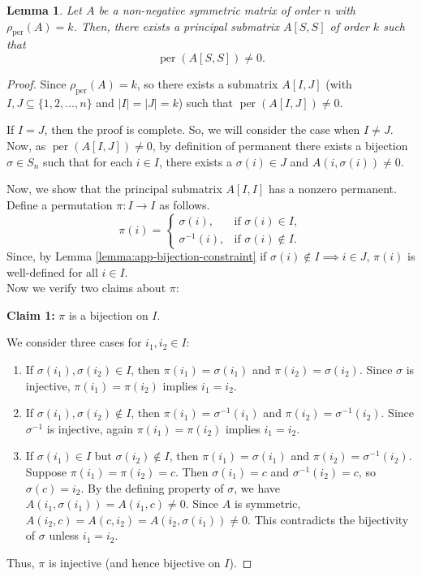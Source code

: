 \documentclass[10pt,a4paper]{amsart}
\newtheorem{lemma}{Lemma}
\DeclareMathOperator{\per}{per}
\begin{document}
\begin{lemma}\label{lemma:app-principal-existence}
Let \( A \) be a non-negative symmetric matrix of order \( n \) with \( \rho_{\per}(A) = k \). Then, there exists a principal submatrix \( A[S, S] \) of order \( k \) such that
\[
\per(A[S, S]) \neq 0.
\]
\end{lemma}

\begin{proof}

Since $\rho_{\per}(A)=k$, so there exists a submatrix \( A[I, J] \) (with \( I, J \subseteq \{1, 2, \dots, n\} \) and \( |I| = |J| = k \)) such that
\(
\per(A[I, J]) \neq 0.
\)

If $I=J$, then the proof is complete. So, we will consider the case when $I \neq J$. Now, as $\per(A[I, J]) \neq 0$, by definition of permanent there exists a bijection $\sigma \in S_n$ such that for each $i \in I$, there exists a $ \sigma(i) \in J$ and 
$ A(i,\sigma(i)) \neq 0. $

Now, we show that the principal submatrix \( A[I, I] \) has a nonzero permanent. Define a permutation \( \pi: I\to I \) as follows.
\[
\pi(i) = 
\begin{cases} 
\sigma(i), & \text{if } \sigma(i) \in I, \\[1mm]
\sigma^{-1}(i), & \text{if } \sigma(i) \notin I.
\end{cases}
\]
Since, by Lemma \ref{lemma:app-bijection-constraint} if \(\sigma(i) \notin I \implies i \in J \), \( \pi(i) \) is well-defined for all \( i \in I\). \\
Now we verify two claims about \( \pi \):


\textbf{Claim 1: }  \( \pi \) is a bijection on \( I \).


We consider three cases for \( i_1, i_2 \in I \):

\begin{enumerate}
    \item  If \( \sigma(i_1), \sigma(i_2) \in I \), then \( \pi(i_1) = \sigma(i_1) \) and \( \pi(i_2) = \sigma(i_2) \). Since \( \sigma \) is injective, \( \pi(i_1) = \pi(i_2) \) implies \( i_1 = i_2 \).
    
    \item  If \( \sigma(i_1), \sigma(i_2) \notin I \), then \( \pi(i_1) = \sigma^{-1}(i_1) \) and \( \pi(i_2) = \sigma^{-1}(i_2) \). Since \( \sigma^{-1} \) is injective, again \( \pi(i_1) = \pi(i_2) \) implies \( i_1 = i_2 \).
    
    \item If \( \sigma(i_1) \in I \) but \( \sigma(i_2) \notin I \), then \( \pi(i_1) = \sigma(i_1) \) and \( \pi(i_2) = \sigma^{-1}(i_2) \). Suppose \( \pi(i_1) = \pi(i_2) = c \). Then \( \sigma(i_1) = c \) and \( \sigma^{-1}(i_2) = c \), so \( \sigma(c) = i_2 \). By the defining property of \( \sigma \), we have \( A(i_1, \sigma(i_1)) = A(i_1, c) \neq 0 \). Since \( A \) is symmetric, \( A(i_2, c) = A(c, i_2) = A(i_2, \sigma(i_1)) \neq 0 \). This contradicts the bijectivity of \( \sigma \) unless \( i_1 = i_2 \).
\end{enumerate}
Thus, \( \pi \) is injective (and hence bijective on \( I \)).



\end{proof}
\end{document}

